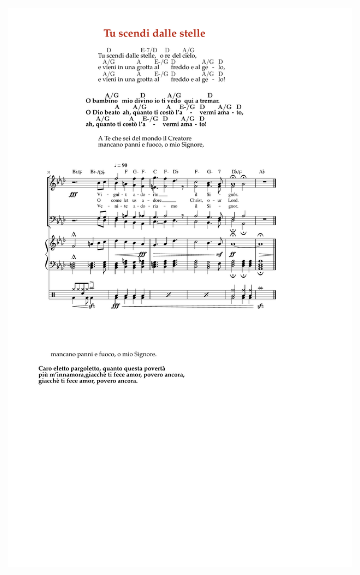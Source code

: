 \documentclass[a4paper,12pt]{article}
\newcommand{\1}{\ensuremath{\mathds{1}}}
\begin{document}
\begin{figure}[!h]
  \captionsetup[subfigure]{labelformat=empty}
    \centering
    \begin{subfigure}[b]{0.4\textwidth}
        \includegraphics[width=\textwidth]{img/accordi}
    \end{subfigure}~
    \begin{subfigure}[b]{0.6\textwidth}

\end{subfigure}
\end{figure}
\end{document}
